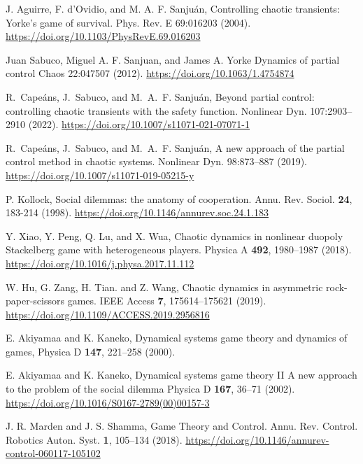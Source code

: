 \begin{thebibliography}{04}



J. Aguirre, F. d’Ovidio, and M. A. F. Sanjuán,
Controlling chaotic transients: Yorke’s game of survival.
Phys. Rev. E 69:016203
(2004).
\url{https://doi.org/10.1103/PhysRevE.69.016203}



Juan Sabuco, Miguel A. F. Sanjuan, and James A. Yorke
Dynamics of partial control
Chaos 22:047507
(2012).
\url{https://doi.org/10.1063/1.4754874}


R.~Cape{\'a}ns, J.~Sabuco, and M.~A.~F. Sanju{\'a}n, 
Beyond partial control: controlling chaotic transients
with the safety function.
Nonlinear Dyn. 107:2903–2910
(2022).
\url{https://doi.org/10.1007/s11071-021-07071-1}

R.~Cape{\'a}ns, J.~Sabuco, and M.~A.~F. Sanju{\'a}n, 
A new approach of the partial control method in chaotic systems.
Nonlinear Dyn. 98:873--887
(2019).
\url{https://doi.org/10.1007/s11071-019-05215-y}





P. Kollock,
Social dilemmas: the anatomy of cooperation.
Annu. Rev. Sociol. \textbf{24}, 183-214
(1998).
\url{https://doi.org/10.1146/annurev.soc.24.1.183}

Y. Xiao, Y. Peng, Q. Lu, and X. Wua,
Chaotic dynamics in nonlinear duopoly Stackelberg game
with heterogeneous players.
Physica A \textbf{492}, 1980--1987
(2018).
\url{https://doi.org/10.1016/j.physa.2017.11.112}

W. Hu, G. Zang, H. Tian. and Z. Wang,
Chaotic dynamics in asymmetric rock-paper-scissors games.
IEEE Access \textbf{7}, 175614--175621
(2019).
\url{https://doi.org/10.1109/ACCESS.2019.2956816}

E. Akiyamaa and K. Kaneko,
Dynamical systems game theory and dynamics of games,
Physica D \textbf{147}, 221--258
(2000).
\url{}

E. Akiyamaa and K. Kaneko,
Dynamical systems game theory II
A new approach to the problem of the social dilemma
Physica D \textbf{167}, 36--71
(2002).
\url{https://doi.org/10.1016/S0167-2789(00)00157-3}

J. R. Marden and J. S. Shamma,
Game Theory and Control.
Annu. Rev. Control. Robotics Auton. Syst. \textbf{1}, 105--134
(2018).
\url{https://doi.org/10.1146/annurev-control-060117-105102}



\end{thebibliography}